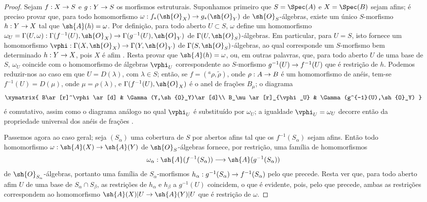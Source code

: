 \documentclass[oneside,10pt]{amsart}
\makeatletter
\newcommand{\ega@arrow}[2]{\mathchoice{#1}{#2}{#2}{#2}}
\renewcommand{\to}{\ega@arrow{\longrightarrow}{\rightarrow}}
\newcommand{\oldpage}[2][]{\marginnote{\normalfont\footnotesize\textbf{#1}~|~#2}\ignorespaces}
\makeatother
\begin{document}
\begin{proof}
Sejam $f:X\to S$ e $g:Y\to S$ os morfismos estruturais.
Suponhamos primeiro que $S=\Spec(A)$ e $X=\Spec(B)$ sejam afins; é preciso provar que, para todo homomorfismo $\omega:f_*(\sh{O}_X)\to g_*(\sh{O}_Y)$ de $\sh{O}_S$-álgebras, existe um único $S$-morfismo $h:Y\to X$ tal que $\sh{A}(h)=\omega$.
Por definição, para todo aberto $U\subset S$, $\omega$ define um homomorfismo $\omega_U=\Gamma(U,\omega):\Gamma(f^{-1}(U),\sh{O}_X)\to\Gamma(g^{-1}(U),\sh{O}_Y)$ de $\Gamma(U,\sh{O}_S)$-álgebras.
Em particular, para $U=S$, isto fornece um homomorfismo $\vphi:\Gamma(X,\sh{O}_X)\to\Gamma(Y,\sh{O}_Y)$ de $\Gamma(S,\sh{O}_S)$-álgebras, ao qual corresponde um $S$-morfismo bem determinado $h:Y\to X$, pois $X$ é afim .
Resta provar que $\sh{A}(h)=\omega$, ou, em outras palavras, que, para todo aberto $U$ de uma base de $S$, $\omega_U$ coincide com o homomorfismo de álgebras $\vphi_U$ correspondente ao $S$-morfismo $g^{-1}(U)\to f^{-1}(U)$ que é restrição de $h$.
Podemos reduzir-nos ao caso em que $U=D(\lambda)$, com $\lambda\in S$; então, se $f=({}^a\rho,\widetilde{\rho})$, onde $\rho:A\to B$ é um homomorfismo de anéis, tem-se $f^{-1}(U)=D(\mu)$, onde $\mu=\rho(\lambda)$, e $\Gamma(f^{-1}(U),\sh{O}_X)$ é o anel de frações $B_\mu$; o diagrama
\[
  \xymatrix{
    B\ar[r]^\vphi\ar[d] &
    \Gamma(Y,\sh{O}_Y)\ar[d]\\
    B_\mu\ar[r]_{\vphi_U} &
    \Gamma(g^{-1}(U),\sh{O}_Y)
  }
\]
é comutativo, assim como o diagrama análogo no qual $\vphi_U$ é substituído por $\omega_U$; a igualdade $\vphi_U=\omega_U$ decorre então da propriedade universal dos anéis de frações .

Passemos agora ao caso geral; seja $(S_\alpha)$ uma cobertura de $S$ por abertos afins
\oldpage[II]{8}
tal que os $f^{-1}(S_\alpha)$ sejam afins.
Então todo homomorfismo $\omega:\sh{A}(X)\to\sh{A}(Y)$ de $\sh{O}_S$-álgebras fornece, por restrição, uma família de homomorfismos
\[
  \omega_\alpha:\sh{A}(f^{-1}(S_\alpha))\to\sh{A}(g^{-1}(S_\alpha))
\]
de $\sh{O}_{S_\alpha}$-álgebras, portanto uma família de $S_\alpha$-morfismos $h_\alpha:g^{-1}(S_\alpha)\to f^{-1}(S_\alpha)$ pelo que precede.
Resta ver que, para todo aberto afim $U$ de uma base de $S_\alpha\cap S_\beta$, as restrições de $h_\alpha$ e $h_\beta$ a $g^{-1}(U)$ coincidem, o que é evidente, pois, pelo que precede, ambas as restrições correspondem ao homomorfismo $\sh{A}(X)|U\to\sh{A}(Y)|U$ que é restrição de $\omega$.
\end{proof}
\end{document}
